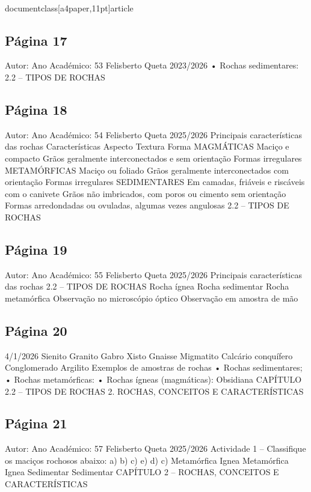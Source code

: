 \\documentclass[a4paper,11pt]{article}
\begin{document}
\subsection*{Página 17}
Autor:
Ano Académico:
53
Felisberto Queta
2023/2026
•
Rochas sedimentares: 
2.2 – TIPOS DE ROCHAS



\subsection*{Página 18}
Autor:
Ano Académico:
54
Felisberto Queta
2025/2026
Principais características das rochas
Características
Aspecto
Textura
Forma
MAGMÁTICAS
Maciço e compacto
Grãos geralmente 
interconectados e sem 
orientação
Formas irregulares
METAMÓRFICAS
Maciço ou foliado
Grãos geralmente 
interconectados com 
orientação
Formas irregulares
SEDIMENTARES
Em camadas, friáveis e riscáveis 
com o canivete
Grãos não imbricados, com 
poros ou cimento sem orientação
Formas arredondadas ou 
ovuladas, algumas vezes 
angulosas
2.2 – TIPOS DE ROCHAS



\subsection*{Página 19}
Autor:
Ano Académico:
55
Felisberto Queta
2025/2026
Principais características das rochas
2.2 – TIPOS DE ROCHAS
Rocha ígnea 
Rocha sedimentar 
Rocha metamórfica 
Observação no 
microscópio óptico
Observação em 
amostra de mão 



\subsection*{Página 20}
4/1/2026
Sienito 
Granito 
Gabro 
Xisto 
Gnaisse 
Migmatito 
Calcário conquífero 
Conglomerado 
Argilito 
Exemplos de amostras de rochas
•
Rochas 
sedimentares; 
•
Rochas 
metamórficas:
•
Rochas ígneas 
(magmáticas):
Obsidiana 
CAPÍTULO 2.2 – TIPOS DE ROCHAS
2. ROCHAS, CONCEITOS E CARACTERÍSTICAS



\subsection*{Página 21}
Autor:
Ano Académico:
57
Felisberto Queta
2025/2026
Actividade 1 – Classifique os maciços rochosos abaixo:
a)
b)
c)
e)
d)
c)
Metamórfica 
Ignea 
Metamórfica 
Ignea 
Sedimentar 
Sedimentar 
CAPÍTULO 2 – ROCHAS, CONCEITOS E CARACTERÍSTICAS
\end{document}
